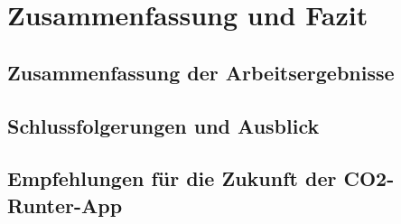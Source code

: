 
\chapter{Zusammenfassung und Fazit }
\label{chapter:7}

\section{Zusammenfassung der Arbeitsergebnisse}

\section{Schlussfolgerungen und Ausblick }

\section{Empfehlungen für die Zukunft der CO2-Runter-App}
